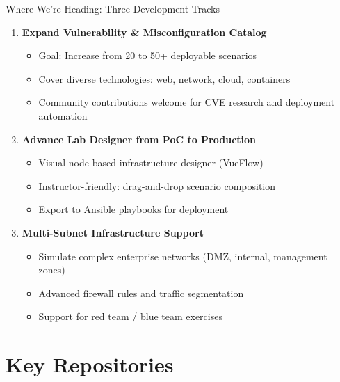 \documentclass[aspectratio=169]{beamer}
\begin{document}
\begin{frame}[shrink=5]{Where We're Heading: Three Development Tracks \; \faRoad}
  \begin{enumerate}
    \item \textbf{Expand Vulnerability \& Misconfiguration Catalog}
    \begin{itemize}
      \item Goal: Increase from 20 to 50+ deployable scenarios
      \item Cover diverse technologies: web, network, cloud, containers
      \item Community contributions welcome for CVE research and deployment automation
    \end{itemize}
    
    \item \textbf{Advance Lab Designer from PoC to Production}
    \begin{itemize}
      \item Visual node-based infrastructure designer (VueFlow)
      \item Instructor-friendly: drag-and-drop scenario composition
      \item Export to Ansible playbooks for deployment
    \end{itemize}
    
    \item \textbf{Multi-Subnet Infrastructure Support}
    \begin{itemize}
      \item Simulate complex enterprise networks (DMZ, internal, management zones)
      \item Advanced firewall rules and traffic segmentation
      \item Support for red team / blue team exercises
    \end{itemize}
  \end{enumerate}
\end{frame}

\section{Key Repositories}
\end{document}
